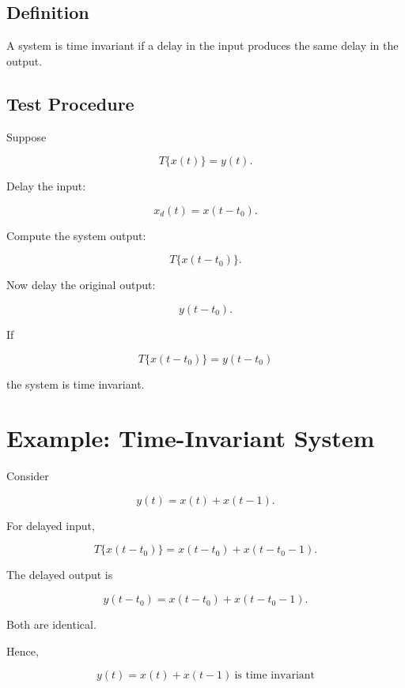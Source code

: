 
\subsection{Definition}

A system is time invariant if a delay in the input produces the same delay in
the output.


\subsection{Test Procedure}

Suppose

\[
T\{x(t)\}=y(t).
\]

Delay the input:

\[
x_d(t)=x(t-t_0).
\]

Compute the system output:

\[
T\{x(t-t_0)\}.
\]

Now delay the original output:

\[
y(t-t_0).
\]

If

\[
\boxed{
T\{x(t-t_0)\}=y(t-t_0)
}
\]

the system is time invariant.


\section{Example: Time-Invariant System}

Consider

\[
y(t)=x(t)+x(t-1).
\]

For delayed input,

\[
T\{x(t-t_0)\}
=
x(t-t_0)+x(t-t_0-1).
\]

The delayed output is

\[
y(t-t_0)
=
x(t-t_0)+x(t-t_0-1).
\]

Both are identical.

Hence,

\[
\boxed{
y(t)=x(t)+x(t-1)\ \text{is time invariant}
}
\]



